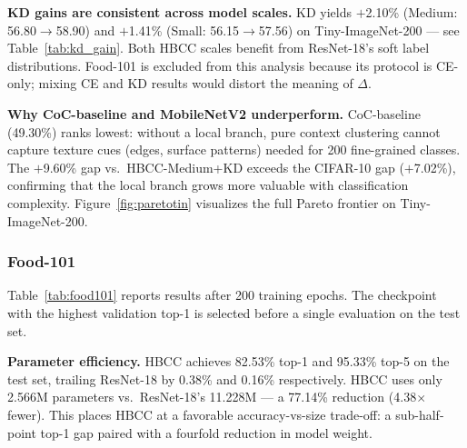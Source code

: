 \documentclass[conference]{IEEEtran}
\begin{document}
\noindent\textbf{KD gains are consistent across model scales.}
KD yields $+$2.10\% (Medium: 56.80$\to$58.90) and $+$1.41\%
(Small: 56.15$\to$57.56) on Tiny-ImageNet-200 ---
see Table~\ref{tab:kd_gain}. Both HBCC scales benefit from
ResNet-18's soft label distributions.
Food-101 is excluded from this analysis because its protocol is
CE-only; mixing CE and KD results would distort the meaning of
$\Delta$.

\noindent\textbf{Why CoC-baseline and MobileNetV2 underperform.}
CoC-baseline (49.30\%) ranks lowest: without a local branch, pure
context clustering cannot capture texture cues (edges, surface
patterns) needed for 200 fine-grained classes. The $+$9.60\% gap
vs.\ HBCC-Medium+KD exceeds the CIFAR-10 gap ($+$7.02\%),
confirming that the local branch grows more valuable with
classification complexity. Figure~\ref{fig:paretotin} visualizes the
full Pareto frontier on Tiny-ImageNet-200.

\subsubsection{Food-101}
\label{ssec:food_results}

Table~\ref{tab:food101} reports results after 200 training epochs.
The checkpoint with the highest validation top-1 is selected before
a single evaluation on the test set.

\begin{table}[ht!]
  \caption{Results on Food-101. \textbf{Bold}: best.}
  \label{tab:food101}
  \centering
  \renewcommand{\arraystretch}{1.12}
\end{table}

\noindent\textbf{Parameter efficiency.}
HBCC achieves 82.53\% top-1 and 95.33\% top-5 on the test set,
trailing ResNet-18 by 0.38\% and 0.16\% respectively. HBCC uses
only 2.566M parameters vs.\ ResNet-18's 11.228M --- a 77.14\%
reduction (4.38$\times$ fewer). This places HBCC at a favorable
accuracy-vs-size trade-off: a sub-half-point top-1 gap paired with
a fourfold reduction in model weight.
\end{document}
